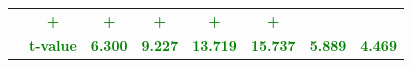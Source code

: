 \documentclass[11pt,english,a4paper,hidelinks]{book}
\begin{document}
\begin{table}[H]
\begin{tabular}{lccccccc}
                     & \textbf{\textcolor{green}{+}}
                     & \textbf{\textcolor{green}{+}}
                     & \textbf{\textcolor{green}{+}}
                     & \textbf{\textcolor{green}{+}}
                     & \textbf{\textcolor{green}{+}} \\
            & \textbf{\textcolor{green}{t-value}}
                     & \textbf{\textcolor{green}{6.300}}
                     & \textbf{\textcolor{green}{9.227}}
                     & \textbf{\textcolor{green}{13.719}}
                     & \textbf{\textcolor{green}{15.737}}
                     & \textbf{\textcolor{green}{5.889}}
                     & \textbf{\textcolor{green}{4.469}} \\    
        \bottomrule
    \end{tabular}
    \label{tab:north_america_growth_consistency}
\end{table}
\end{document}
